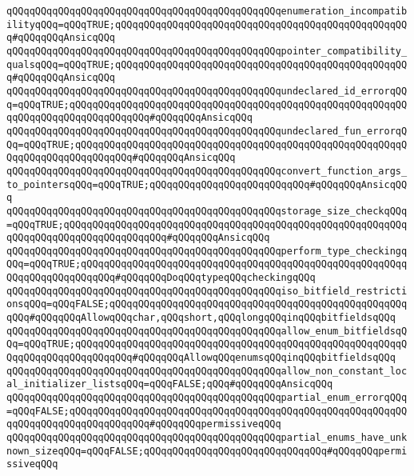 \verb|qQQqqQQqqQQqqQQqqQQqqQQqqQQqqQQqqQQqqQQqqQQqqQQqenumeration_incompatibilityqQQq=qQQqTRUE;qQQqqQQqqQQqqQQqqQQqqQQqqQQqqQQqqQQqqQQqqQQqqQQqqQQq#qQQqqQQqAnsicqQQq|\newline
\verb|qQQqqQQqqQQqqQQqqQQqqQQqqQQqqQQqqQQqqQQqqQQqqQQqpointer_compatibility_qualsqQQq=qQQqTRUE;qQQqqQQqqQQqqQQqqQQqqQQqqQQqqQQqqQQqqQQqqQQqqQQqqQQq#qQQqqQQqAnsicqQQq|\newline
\verb|qQQqqQQqqQQqqQQqqQQqqQQqqQQqqQQqqQQqqQQqqQQqqQQqundeclared_id_errorqQQq=qQQqTRUE;qQQqqQQqqQQqqQQqqQQqqQQqqQQqqQQqqQQqqQQqqQQqqQQqqQQqqQQqqQQqqQQqqQQqqQQqqQQqqQQqqQQq#qQQqqQQqAnsicqQQq|\newline
\verb|qQQqqQQqqQQqqQQqqQQqqQQqqQQqqQQqqQQqqQQqqQQqqQQqundeclared_fun_errorqQQq=qQQqTRUE;qQQqqQQqqQQqqQQqqQQqqQQqqQQqqQQqqQQqqQQqqQQqqQQqqQQqqQQqqQQqqQQqqQQqqQQqqQQqqQQq#qQQqqQQqAnsicqQQq|\newline
\verb|qQQqqQQqqQQqqQQqqQQqqQQqqQQqqQQqqQQqqQQqqQQqqQQqconvert_function_args_to_pointersqQQq=qQQqTRUE;qQQqqQQqqQQqqQQqqQQqqQQqqQQq#qQQqqQQqAnsicqQQq|\newline
\verb|qQQqqQQqqQQqqQQqqQQqqQQqqQQqqQQqqQQqqQQqqQQqqQQqstorage_size_checkqQQq=qQQqTRUE;qQQqqQQqqQQqqQQqqQQqqQQqqQQqqQQqqQQqqQQqqQQqqQQqqQQqqQQqqQQqqQQqqQQqqQQqqQQqqQQqqQQqqQQq#qQQqqQQqAnsicqQQq|\newline
\verb|qQQqqQQqqQQqqQQqqQQqqQQqqQQqqQQqqQQqqQQqqQQqqQQqperform_type_checkingqQQq=qQQqTRUE;qQQqqQQqqQQqqQQqqQQqqQQqqQQqqQQqqQQqqQQqqQQqqQQqqQQqqQQqqQQqqQQqqQQqqQQqqQQq#qQQqqQQqDoqQQqtypeqQQqcheckingqQQq|\newline
\verb|qQQqqQQqqQQqqQQqqQQqqQQqqQQqqQQqqQQqqQQqqQQqqQQqiso_bitfield_restrictionsqQQq=qQQqFALSE;qQQqqQQqqQQqqQQqqQQqqQQqqQQqqQQqqQQqqQQqqQQqqQQqqQQqqQQq#qQQqqQQqAllowqQQqchar,qQQqshort,qQQqlongqQQqinqQQqbitfieldsqQQq|\newline
\verb|qQQqqQQqqQQqqQQqqQQqqQQqqQQqqQQqqQQqqQQqqQQqqQQqallow_enum_bitfieldsqQQq=qQQqTRUE;qQQqqQQqqQQqqQQqqQQqqQQqqQQqqQQqqQQqqQQqqQQqqQQqqQQqqQQqqQQqqQQqqQQqqQQqqQQqqQQq#qQQqqQQqAllowqQQqenumsqQQqinqQQqbitfieldsqQQq|\newline
\verb|qQQqqQQqqQQqqQQqqQQqqQQqqQQqqQQqqQQqqQQqqQQqqQQqallow_non_constant_local_initializer_listsqQQq=qQQqFALSE;qQQq#qQQqqQQqAnsicqQQq|\newline
\verb|qQQqqQQqqQQqqQQqqQQqqQQqqQQqqQQqqQQqqQQqqQQqqQQqpartial_enum_errorqQQq=qQQqFALSE;qQQqqQQqqQQqqQQqqQQqqQQqqQQqqQQqqQQqqQQqqQQqqQQqqQQqqQQqqQQqqQQqqQQqqQQqqQQqqQQqqQQq#qQQqqQQqpermissiveqQQq|\newline
\verb|qQQqqQQqqQQqqQQqqQQqqQQqqQQqqQQqqQQqqQQqqQQqqQQqpartial_enums_have_unknown_sizeqQQq=qQQqFALSE;qQQqqQQqqQQqqQQqqQQqqQQqqQQqqQQq#qQQqqQQqpermissiveqQQq|\newline
